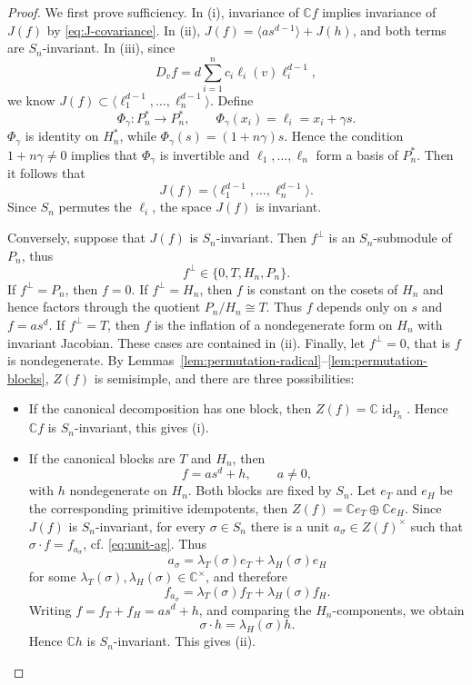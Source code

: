 \documentclass[11pt,reqno]{amsart}
\numberwithin{equation}{section}
\theoremstyle{definition}
\theoremstyle{remark}
\newcommand{\C}{\mathbb C}
\begin{document}
\begin{proof}
We first prove sufficiency.  In \textup{(i)}, invariance of $\C f$
implies invariance of $J(f)$ by \eqref{eq:J-covariance}.  In
\textup{(ii)}, $J(f)=\langle a s^{d-1}\rangle+J(h)$, and both terms are $S_n$-invariant. In \textup{(iii)}, since 
\[D_vf
  =
  d\sum_{i=1}^n
  c_i\ell_i(v)\ell_i^{d-1},\]
we know $J(f)\subset 
  \langle
    \ell_1^{d-1},\ldots,\ell_n^{d-1}
  \rangle$. Define
\[
  \Phi_\gamma:P_n^*\longrightarrow P_n^*,
  \qquad
  \Phi_\gamma(x_i)=\ell_i=x_i+\gamma s.
\]
 $\Phi_\gamma$ is identity on $H_n^*$, while $ \Phi_\gamma(s)=(1+n\gamma)s$. Hence the condition $1+n\gamma\ne0$ implies that $\Phi_\gamma$ is invertible and $\ell_1,\dots,\ell_n$ form a basis of $P_n^*$.  Then it follows that
\[
  J(f)
  =
  \langle
    \ell_1^{d-1},\ldots,\ell_n^{d-1}
  \rangle.
\]
Since $S_n$ permutes the $\ell_i$, the space $J(f)$ is invariant.

Conversely, suppose that $J(f)$ is $S_n$-invariant.  Then
$f^\perp$ is an $S_n$-submodule of $P_n$, thus
\[
  f^\perp\in\{0,T,H_n,P_n\}.
\]
If $f^\perp=P_n$, then $f=0$.  If $f^\perp=H_n$, then $f$ is constant on the cosets of $H_n$ and hence factors through
the quotient $P_n/H_n\cong T$. Thus $f$ depends only on $s$ and  $f=a s^d$. If
$f^\perp=T$, then $f$ is the inflation of a nondegenerate form on
$H_n$ with invariant Jacobian. These cases are contained in
\textup{(ii)}. Finally, let $f^\perp=0$, that is $f$ is nondegenerate.  By
Lemmas~\ref{lem:permutation-radical}--\ref{lem:permutation-blocks}, $Z(f)$ is semisimple, and there are three possibilities:
\begin{itemize}[leftmargin=0.7cm]
\item If the canonical decomposition has one block, then
$Z(f)=\C\operatorname{id}_{P_n}$.  Hence  $\C f$ is $S_n$-invariant, this
gives \textup{(i)}.

\item If the canonical blocks are $T$ and $H_n$, then
\[
  f=a s^d+h,
  \qquad a\ne0,
\]
with $h$ nondegenerate on $H_n$.  Both blocks are fixed by $S_n$.  Let
$e_T$ and $e_H$ be the corresponding primitive idempotents, then  $Z(f)=\C e_T\oplus\C e_H$. Since $J(f)$ is $S_n$-invariant, for every $\sigma\in S_n$ there is
a unit $a_\sigma\in Z(f)^\times$ such that $\sigma\cdot f=f_{a_\sigma}$, cf. \eqref{eq:unit-ag}. Thus
\[
  a_\sigma
  =
  \lambda_T(\sigma)e_T+\lambda_H(\sigma)e_H
\]
for some $\lambda_T(\sigma),\lambda_H(\sigma)\in\C^\times$, and
therefore
\[
  f_{a_\sigma}
  =
  \lambda_T(\sigma)f_T+\lambda_H(\sigma)f_H.
\]
Writing  $f=f_T+f_H=a s^d+h$, and comparing the $H_n$-components, we obtain
\[
  \sigma\cdot h=\lambda_H(\sigma)h.
\]
Hence $\C h$ is $S_n$-invariant. This gives \textup{(ii)}.


\end{itemize}
\end{proof}
\end{document}
